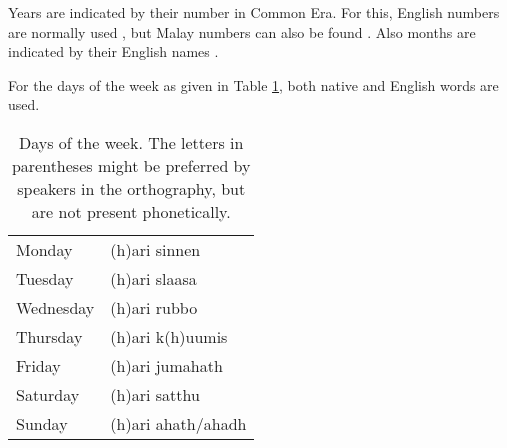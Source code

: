  

Years are indicated by their number in Common Era. For this, English numbers are normally used , but Malay numbers can also be found . Also months are indicated by their English names .






For the days of the week as given in Table \ref{tab:DaysOfTheWeek}, both native and English words are used.

\begin{table}
\centering
 \begin{tabular}{ll}
Monday & (h)ari sinnen\\
Tuesday&(h)ari slaasa\\
Wednesday& (h)ari rubbo \\
Thursday& (h)ari k(h)uumis \\
Friday&(h)ari jumahath \\
Saturday&(h)ari satthu \\
Sunday&(h)ari ahath/ahadh \\
 \end{tabular}
 \caption[Days of the week]{Days of the week. The letters in parentheses might be preferred by speakers in the orthography, but are not present phonetically.}
 \label{tab:DaysOfTheWeek}
\end{table}


